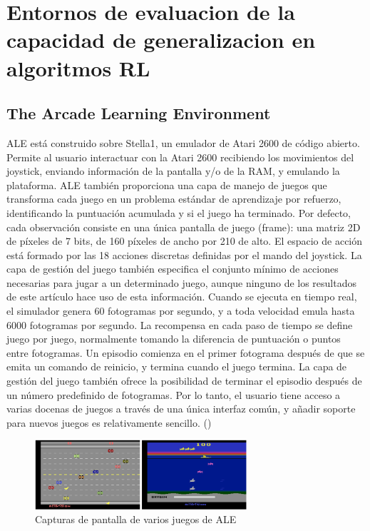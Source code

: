 \section{Entornos de evaluacion de la capacidad de generalizacion en algoritmos RL}\label{section:state-of-the-art:evaluation-enviroments-for-generalization-on-rl-algoritms}

\subsection{The Arcade Learning Environment}\label{section:state-of-the-art:evaluation-enviroments-for-generalization-on-rl-algoritms:ALE}

ALE está construido sobre Stella1, un emulador de Atari 2600 de código abierto. Permite al usuario interactuar con la Atari 2600 recibiendo los movimientos del joystick, enviando información de la pantalla y/o de la RAM, y emulando la plataforma. ALE también proporciona una capa de manejo de juegos que transforma cada juego en un problema estándar de aprendizaje por refuerzo, identificando la puntuación acumulada y si el juego ha terminado. Por defecto, cada observación consiste en una única pantalla de juego (frame): una matriz 2D de píxeles de 7 bits, de 160 píxeles de ancho por 210 de alto. El espacio de acción está formado por las 18 acciones discretas definidas por el mando del joystick. La capa de gestión del juego también especifica el conjunto mínimo de acciones necesarias para jugar a un determinado juego, aunque ninguno de los resultados de este artículo hace uso de esta información. Cuando se ejecuta en tiempo real, el simulador genera 60 fotogramas por segundo, y a toda velocidad emula hasta 6000 fotogramas por segundo. La recompensa en cada paso de tiempo se define juego por juego, normalmente tomando la diferencia de puntuación o puntos entre fotogramas. Un episodio comienza en el primer fotograma después de que se emita un comando de reinicio, y termina cuando el juego termina. La capa de gestión del juego también ofrece la posibilidad de terminar el episodio después de un número predefinido de fotogramas. Por lo tanto, el usuario tiene acceso a varias docenas de juegos a través de una única interfaz común, y añadir soporte para nuevos juegos es relativamente sencillo. (\cite{bellemare2013arcade})

\begin{figure}[ht!]
    \centering
    \includegraphics[width=0.7\textwidth]{Graphics/ale.png}
    \caption{Capturas de pantalla de varios juegos de ALE}
    \label{fig:ale}
\end{figure}

